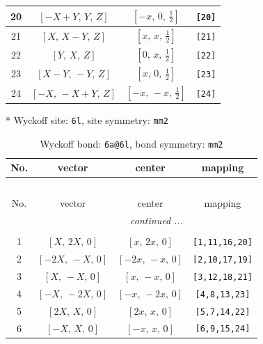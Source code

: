 \documentclass[fleqn,8pt]{jsarticle}
\begin{document}
\begin{longtable}{cccc}
20 & $\left[ - X + Y,\, Y,\, Z \right]$ & $\left[ - x,\, 0,\, \frac{1}{2} \right]$ & {\tt [20]} \\ \hline
21 & $\left[ X,\, X - Y,\, Z \right]$ & $\left[ x,\, x,\, \frac{1}{2} \right]$ & {\tt [21]} \\ \hline
22 & $\left[ Y,\, X,\, Z \right]$ & $\left[ 0,\, x,\, \frac{1}{2} \right]$ & {\tt [22]} \\ \hline
23 & $\left[ X - Y,\, - Y,\, Z \right]$ & $\left[ x,\, 0,\, \frac{1}{2} \right]$ & {\tt [23]} \\ \hline
24 & $\left[ - X,\, - X + Y,\, Z \right]$ & $\left[ - x,\, - x,\, \frac{1}{2} \right]$ & {\tt [24]} \\
\end{longtable}
* Wyckoff site: {\tt 6l}, site symmetry: {\tt mm2}
\renewcommand{\arraystretch}{1.2}
\begin{longtable}{cccc}
\caption{Wyckoff bond: {\tt 6a@6l}, bond symmetry: {\tt mm2}}
 \\
 \hline \hline
No. & vector & center & mapping \\ \hline \endfirsthead

\multicolumn{3}{l}{\tablename\ \thetable{}} \\
 \hline \hline
No. & vector & center & mapping \\ \hline \endhead

 \hline \hline
\multicolumn{3}{r}{\footnotesize\it continued ...} \\ \endfoot

 \hline \hline
\multicolumn{3}{r}{} \\ \endlastfoot

1 & $\left[ X,\, 2 X,\, 0 \right]$ & $\left[ x,\, 2 x,\, 0 \right]$ & {\tt [1,11,16,20]} \\ \hline
2 & $\left[ - 2 X,\, - X,\, 0 \right]$ & $\left[ - 2 x,\, - x,\, 0 \right]$ & {\tt [2,10,17,19]} \\ \hline
3 & $\left[ X,\, - X,\, 0 \right]$ & $\left[ x,\, - x,\, 0 \right]$ & {\tt [3,12,18,21]} \\ \hline
4 & $\left[ - X,\, - 2 X,\, 0 \right]$ & $\left[ - x,\, - 2 x,\, 0 \right]$ & {\tt [4,8,13,23]} \\ \hline
5 & $\left[ 2 X,\, X,\, 0 \right]$ & $\left[ 2 x,\, x,\, 0 \right]$ & {\tt [5,7,14,22]} \\ \hline
6 & $\left[ - X,\, X,\, 0 \right]$ & $\left[ - x,\, x,\, 0 \right]$ & {\tt [6,9,15,24]} \\
\end{longtable}
\renewcommand{\arraystretch}{1.2}
\end{document}
